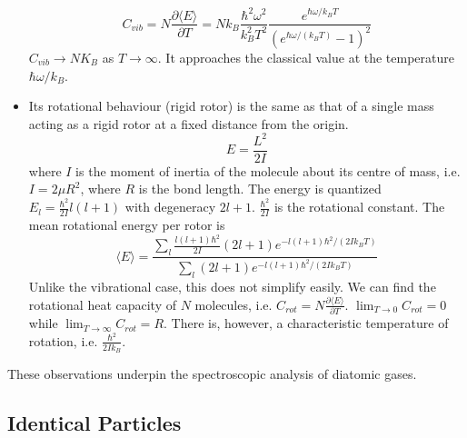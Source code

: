\documentclass[a4paper]{article}
\begin{document}
\begin{Note}
\begin{itemize}
$$C_{vib}=N\frac{\partial\langle E\rangle}{\partial T}=Nk_B\frac{\hbar^2\omega^2}{k_B^2T^2}\frac{e^{\hbar\omega/k_BT}}{(e^{\hbar\omega/(k_BT)}-1)^2}$$
$C_{vib}\rightarrow NK_B$ as $T\rightarrow\infty$. It approaches the classical value at the temperature $\hbar\omega/k_B$.
\item Its rotational behaviour (rigid rotor) is the same as that of a
single mass acting as a rigid rotor at a fixed distance
from the origin.
$$E=\frac{L^2}{2I}$$
where $I$ is the moment of inertia of the molecule about its centre of mass, i.e. $I=2\mu R^2$, where $R$ is the bond length. The energy is quantized $E_l=\frac{\hbar^2}{2I}l(l+1)$ with degeneracy $2l+1$. $\frac{\hbar^2}{2I}$ is the rotational constant. The mean rotational energy per rotor is
$$\langle E\rangle=\frac{\sum_l\frac{l(l+1)\hbar^2}{2I}(2l+1)e^{-l(l+1)\hbar^2/(2Ik_BT)}}{\sum_l(2l+1)e^{-l(l+1)\hbar^2/(2Ik_BT)}}$$
Unlike the vibrational case, this does not simplify easily. We can find the rotational heat capacity of $N$ molecules, i.e. $C_{rot}=N\frac{\partial\langle E\rangle}{\partial T}$. $\lim_{T\rightarrow0}C_{rot}=0$ while $\lim_{T\rightarrow\infty}C_{rot}=R$. There is, however, a characteristic temperature of rotation, i.e. $\frac{\hbar^2}{2Ik_B}$. 
\end{itemize}
These observations underpin the spectroscopic analysis
of diatomic gases.
\end{Note}
\newpage
\subsection{Identical Particles}
\end{document}
